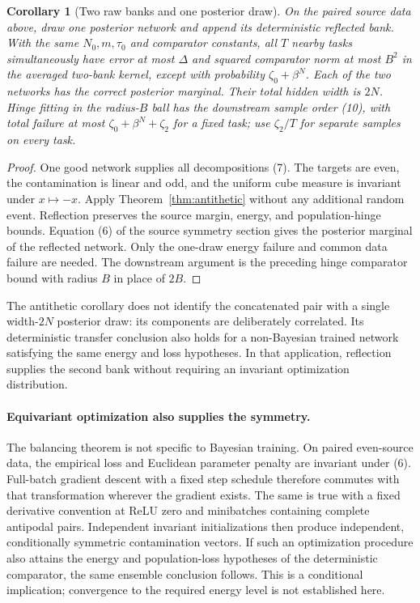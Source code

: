 \documentclass[11pt]{article}
\newtheorem{corollary}[theorem]{Corollary}
\begin{document}
\begin{corollary}[Two raw banks and one posterior draw]\label{cor:antithetic}
On the paired source data above, draw one posterior network and append
its deterministic reflected bank. With the same $N_0,m,\tau_0$ and
comparator constants, all $T$ nearby tasks simultaneously have error
at most $\Delta$ and squared comparator norm at most $B^2$ in the
averaged two-bank kernel, except with probability
$\zeta_0+\beta^N$. Each of the two networks has the correct posterior
marginal. Their total hidden width is $2N$.
Hinge fitting in the radius-$B$ ball has the downstream sample order
(10), with total failure at most $\zeta_0+\beta^N+\zeta_2$ for a fixed
task; use $\zeta_2/T$ for separate samples on every task.
\end{corollary}
\begin{proof}
One good network supplies all decompositions (7). The targets are even,
the contamination is linear and odd, and the uniform cube measure is
invariant under $x\mapsto-x$. Apply Theorem~\ref{thm:antithetic}
without any additional random event. Reflection preserves the source
margin, energy, and population-hinge bounds. Equation (6) of the source
symmetry section gives the posterior marginal of the reflected network.
Only the one-draw energy failure and common data failure are needed.
The downstream argument is the preceding hinge comparator bound with
radius $B$ in place of $2B$.
\end{proof}

The antithetic corollary does not identify the concatenated pair with a
single width-$2N$ posterior draw: its components are deliberately
correlated. Its deterministic transfer conclusion also holds for a
non-Bayesian trained network satisfying the same energy and loss
hypotheses. In that application, reflection supplies the second bank
without requiring an invariant optimization distribution.

\paragraph{Equivariant optimization also supplies the symmetry.}
The balancing theorem is not specific to Bayesian training. On paired
even-source data, the empirical loss and Euclidean parameter penalty
are invariant under (6). Full-batch gradient descent with a fixed step
schedule therefore commutes with that transformation wherever the
gradient exists. The same is true with a fixed derivative convention
at ReLU zero and minibatches containing complete antipodal pairs.
Independent invariant initializations then produce independent,
conditionally symmetric contamination vectors. If such an optimization
procedure also attains the energy and population-loss hypotheses of
the deterministic comparator, the same ensemble conclusion follows.
This is a conditional implication; convergence to the required energy
level is not established here.
\end{document}
